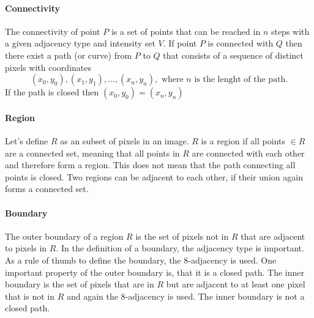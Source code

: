 \paragraph{Connectivity}
The connectivity of point $P$ is a set of points that can be reached in $n$ steps with a given adjacency type and intensity set $V$. If point $P$ is connected with $Q$ then there exist a path (or curve) from $P$ to $Q$ that consists of a sequence of distinct pixels with coordinates 
\begin{equation*}
    (x_0,y_0),(x_1,y_1),...,(x_n,y_n), \text{ where $n$ is the lenght of the path.}
\end{equation*}
If the path is closed then $(x_0,y_0) = (x_n,y_n)$
\paragraph{Region}
Let's define $R$ as an subset of pixels in an image. $R$ is a region if all points $\in R$ are a connected set, meaning that all points in $R$ are connected with each other and therefore form a region. This does not mean that the path connecting all points is closed.  Two regions can be adjacent to each other, if their union again forms a connected set. 

\paragraph{Boundary}
The outer boundary of a region $R$ is the set of pixels not in $R$ that are adjacent to pixels in $R$. In the definition of a boundary, the adjacency type is important. As a rule of thumb to define the boundary, the 8-adjacency is used. One important property of the outer boundary is, that it is a closed path. The inner boundary is the set of pixels that are in $R$ but are adjacent to at least one pixel that is not in $R$ and again the 8-adjacency is used. The inner boundary is not a closed path. 

